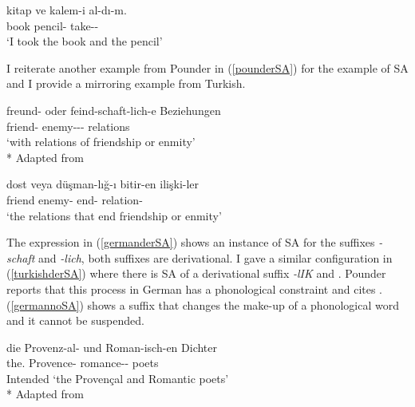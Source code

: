 \begin{exe}
    \ex \label{recuperand} 
    \gll kitap ve kalem-i al-dı-m. \\
    book {\And} pencil-{\Acc} take-{\Pst}-{\Fsg} \\ 
    \glt `I took the book and the pencil'
\end{exe}

I reiterate another example from Pounder in (\ref{pounderSA}) for the example of SA and I provide a mirroring example from Turkish.

\begin{exe}
    \ex \label{pounderSA}
    \begin{xlist}
        \ex \label{germanderSA}
        \gll freund- oder feind-schaft-lich-e Beziehungen \\ 
        friend- {\Or} enemy-{\Der}-{\Der}-{\Pl} relations \\
        \glt `with relations of friendship or enmity' \\*
        \hfill Adapted from \cite{pounder2006broken}
        
        \ex \label{turkishderSA} 
        \gll dost veya düşman-lığ-ı bitir-en ilişki-ler \\ 
        friend {\Or} enemy-{\Der} end-{\Fp} relation-{\Pl} \\
        \glt `the relations that end friendship or enmity'
    \end{xlist}
\end{exe}

The expression in (\ref{germanderSA}) shows an instance of SA for the suffixes \textit{-schaft} and \textit{-lich}, both suffixes are derivational. I gave a similar configuration in (\ref{turkishderSA}) where there is SA of a derivational suffix \textit{-lIK} and {\Acc}. Pounder reports that this process in German has a phonological constraint and cites \cite{smith2000word}. 
(\ref{germannoSA}) shows a suffix that changes the make-up of a phonological word and it cannot be suspended.

\begin{exe}
    \ex \label{germannoSA}
    \gll *die Provenz-al- und Roman-isch-en Dichter \\ 
    the.{\Pl} Provence-{\Der} {\And} romance-{\Der}-{\Pl} poets \\
    \glt Intended `the Provençal and Romantic poets'\\*
    \hfill Adapted from \cite{pounder2006broken}
\end{exe}

